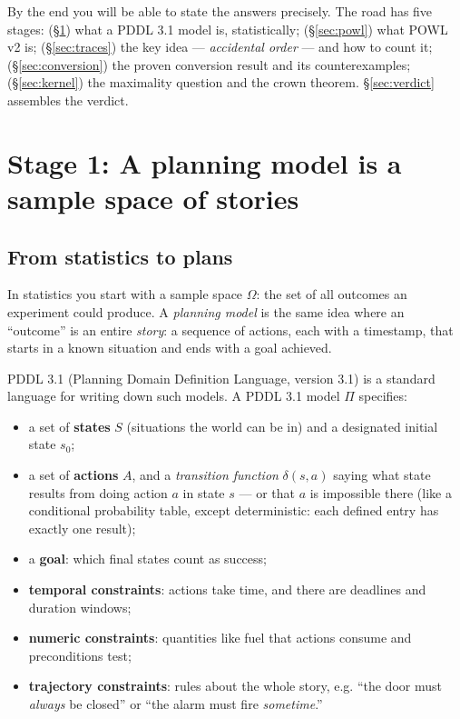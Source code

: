 \documentclass[11pt]{article}
\theoremstyle{definition}
\theoremstyle{plain}
\theoremstyle{remark}
\begin{document}
By the end you will be able to state the answers precisely. The road has
five stages: (\S\ref{sec:pddl}) what a PDDL 3.1 model is, statistically;
(\S\ref{sec:powl}) what POWL v2 is; (\S\ref{sec:traces}) the key idea ---
\emph{accidental order} --- and how to count it; (\S\ref{sec:conversion})
the proven conversion result and its counterexamples; (\S\ref{sec:kernel})
the maximality question and the crown theorem. \S\ref{sec:verdict} assembles
the verdict.

\section{Stage 1: A planning model is a sample space of stories}
\label{sec:pddl}

\subsection{From statistics to plans}

In statistics you start with a sample space $\Omega$: the set of all
outcomes an experiment could produce. A \emph{planning model} is the same
idea where an ``outcome'' is an entire \emph{story}: a sequence of actions,
each with a timestamp, that starts in a known situation and ends with a goal
achieved.

PDDL 3.1 (Planning Domain Definition Language, version 3.1) is a standard
language for writing down such models. A PDDL 3.1 model $\Pi$ specifies:

\begin{itemize}[nosep]
  \item a set of \textbf{states} $S$ (situations the world can be in) and a
  designated initial state $s_0$;
  \item a set of \textbf{actions} $A$, and a \emph{transition function}
  $\delta(s, a)$ saying what state results from doing action $a$ in state
  $s$ --- or that $a$ is impossible there (like a conditional probability
  table, except deterministic: each defined entry has exactly one result);
  \item a \textbf{goal}: which final states count as success;
  \item \textbf{temporal constraints}: actions take time, and there are
  deadlines and duration windows;
  \item \textbf{numeric constraints}: quantities like fuel that actions
  consume and preconditions test;
  \item \textbf{trajectory constraints}: rules about the whole story, e.g.
  ``the door must \emph{always} be closed'' or ``the alarm must fire
  \emph{sometime}.''
\end{itemize}
\end{document}
